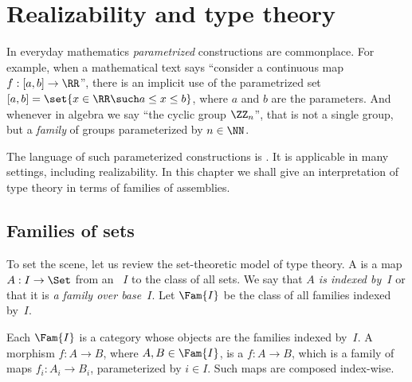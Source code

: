\chapter{Realizability and type theory}
\label{cha:type-theory-real}

In everyday mathematics \emph{parametrized} constructions are commonplace. For
example, when a mathematical text says ``consider a continuous map $f
: [a,b] \to \RR$'', there is an
implicit use of the parametrized set $[a,b] = \set{x \in \RR \such a
  \leq x \leq b}$, where $a$ and $b$ are the parameters. 
And whenever in algebra we say ``the cyclic group $\ZZ_n$'', that is not a single group, but a \emph{family} of groups parameterized by $n \in \NN$.

The language of such parameterized constructions is . It is applicable in many settings, including realizability. In this chapter we shall give an interpretation of type theory in terms of families of assemblies.


\section{Families of sets}
\label{sec:families-sets}

To set the scene, let us review the set-theoretic model of type theory. A  is a map $A : I \to \Set$ from an ~$I$ to the class of all sets. We say that \emph{$A$ is indexed by~$I$} or that it is \emph{a family over base~$I$}. Let $\Fam{I}$ be the class of all families indexed by~$I$.

Each $\Fam{I}$ is a category whose objects are the families indexed by~$I$. A morphism $f : A \to B$, where $A, B \in \Fam{I}$, is a  $f : A \to B$, which is a family of maps $f_i : A_i \to B_i$, parameterized by $i \in I$. Such maps are composed index-wise.

